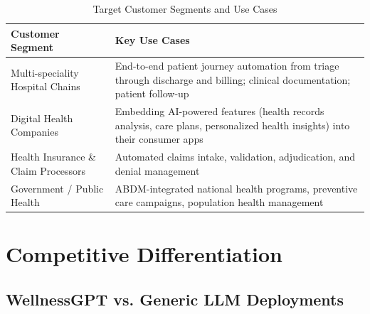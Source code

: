 \documentclass[12pt,a4paper]{article}
\begin{document}
\begin{table}[H]
\centering
\renewcommand{\arraystretch}{1.4}
\begin{tabularx}{\textwidth}{lX}
\toprule
\textbf{Customer Segment} & \textbf{Key Use Cases} \\
\midrule
Multi-speciality Hospital Chains & End-to-end patient journey automation from triage through discharge and billing; clinical documentation; patient follow-up \\
Digital Health Companies         & Embedding AI-powered features (health records analysis, care plans, personalized health insights) into their consumer apps \\
Health Insurance \& Claim Processors & Automated claims intake, validation, adjudication, and denial management \\
Government / Public Health       & ABDM-integrated national health programs, preventive care campaigns, population health management \\
\bottomrule
\end{tabularx}
\caption{Target Customer Segments and Use Cases}
\end{table}

\newpage

\section{Competitive Differentiation}

\subsection{WellnessGPT vs. Generic LLM Deployments}
\end{document}

